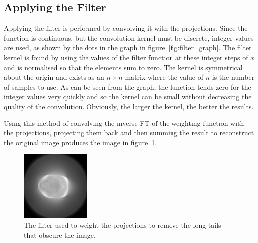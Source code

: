     \subsection{Applying the Filter} %
    \label{sub:applying_the_filter}
        Applying the filter is performed by convolving it with the projections. Since the function is continuous, but the convolution kernel must be discrete, integer values are used, as shown by the dots in the graph in figure~\ref{fig:filter_graph}. The filter kernel is found by using the values of the filter function at these integer steps of $x$ and is normalised so that the elements sum to zero. The kernel is symmetrical about the origin and exists as an $n \times n$ matrix where the value of $n$ is the number of samples to use. As can be seen from the graph, the function tends zero for the integer values very quickly and so the kernel can be small without decreasing the quality of the convolution. Obviously, the larger the kernel, the better the results.

        Using this method of convolving the inverse FT of the weighting function with the projections, projecting them back and then summing the result to reconstruct the original image produces the image in figure~\ref{fig:filtered_backprojection}.
        \begin{figure}[ht]
            \centering
                \includegraphics[width=0.3\textwidth]{Files/report_images/SUM_backprojections_k5.jpg}
            \caption{The filter used to weight the projections to remove the long tails that obscure the image.\label{fig:filtered_backprojection}}
        \end{figure}

